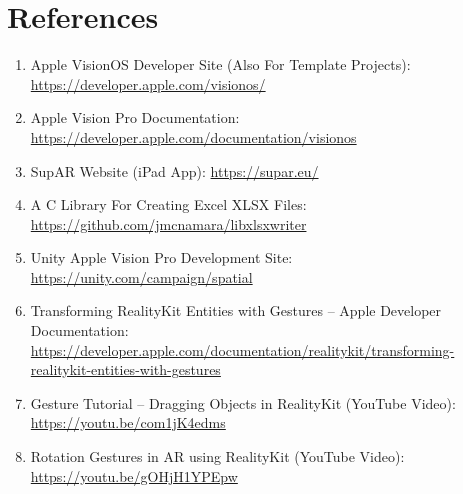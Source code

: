 \chapter*{References}

\begin{enumerate}
    \item Apple VisionOS Developer Site (Also For Template Projects): \url{https://developer.apple.com/visionos/}
    \item Apple Vision Pro Documentation: \url{https://developer.apple.com/documentation/visionos}
    \item SupAR Website (iPad App): \url{https://supar.eu/}
    \item A C Library For Creating Excel XLSX Files: \url{https://github.com/jmcnamara/libxlsxwriter}
    \item Unity Apple Vision Pro Development Site: \url{https://unity.com/campaign/spatial}
    \item Transforming RealityKit Entities with Gestures – Apple Developer Documentation: \url{https://developer.apple.com/documentation/realitykit/transforming-realitykit-entities-with-gestures}
    \item Gesture Tutorial – Dragging Objects in RealityKit (YouTube Video): \url{https://youtu.be/com1jK4edms}
    \item Rotation Gestures in AR using RealityKit (YouTube Video): \url{https://youtu.be/gOHjH1YPEpw}
\end{enumerate}
